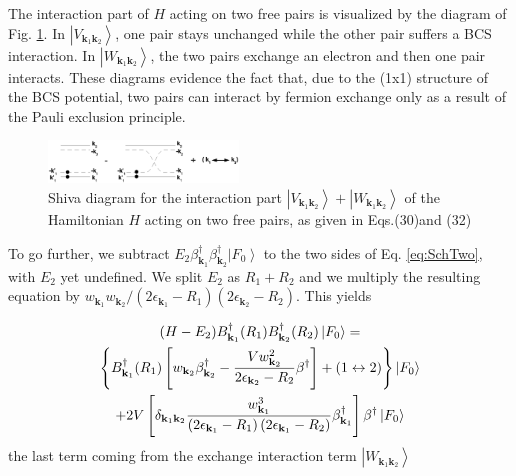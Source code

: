 \documentclass[aps,prb,superscriptaddress,showpacs,reprint,lengthcheck]{revtex4}
\begin{document}
The interaction part of $H$ acting on two free pairs is  visualized by
the diagram of Fig. \ref{fig:twoP}. In $\left|V_{\mathbf{k} _1\mathbf{k} _2}\right>$, one pair stays unchanged while the other pair suffers a BCS interaction. In $\left|W_{\mathbf{k} _1\mathbf{k} _2}\right>$, the two pairs exchange an electron and then one pair interacts.   These diagrams evidence the fact that,
due to the (1x1) structure of the BCS potential,  two pairs 
can  interact by fermion exchange only as a result of the
Pauli exclusion principle.

\begin{figure}[htb]
   \includegraphics[width=0.45\textwidth]{twoPair.eps}
\caption{Shiva diagram for the interaction part $\left|V_{\mathbf{k} _1\mathbf{k} _2}\right>+\left|W_{\mathbf{k} _1\mathbf{k} _2}\right>$ of the Hamiltonian $H$ acting on two free pairs, as given in Eqs.(30)and (32)}
\label{fig:twoP}
\end{figure}


To go further, we subtract $E _2\beta^{\dagger}_{\mathbf{k}
_1}\beta^{\dagger}_{\mathbf{k} _2}\left|F_0\right>  $ to the two sides of Eq.%
\eqref{eq:SchTwo}, with $E _2$ yet undefined. We split $E _2$ as $R_1+R_2$ and we multiply
the resulting equation by $w_{\mathbf{k} _1}w_{\mathbf{k} _2}/\left(2%
\epsilon_{\mathbf{k} _1}-R_1\right) \left(2\epsilon_{\mathbf{k}
_2}-R_2\right) $. This yields


\begin{multline}  \label{eq:SchTwo2}
(H-E _2)B^{\dagger}_{\mathbf{k} _1}(R_1)B^{\dagger}_{\mathbf{k}
_2}(R_2)\left|F_0\right>   = \\
\left\{B^{\dagger}_{\mathbf{k} _1}(R_1)\left[w_{\mathbf{k}
_2}\beta^{\dagger}_{\mathbf{k} _2}-\frac{Vw_{\mathbf{k} _2}^2}{2\epsilon_{%
\mathbf{k} _2}-R_2}\beta^{\dagger}\right]+(1\leftrightarrow2)\right\}
\left|F_0\right>  \\
+2V\left[\delta_{{\mathbf{k} _1}{\mathbf{k} _2}}\frac{w^3_{{\mathbf{k} _1}}}{\left(2%
\epsilon_{\mathbf{k} _1}-R_1\right) \left(2\epsilon_{\mathbf{k}
_1}-R_2\right)}\beta^\dagger_{{\mathbf{k} _1}}\right]\beta^\dagger\left|F_0\right>  
\end{multline}
the last term coming from the exchange interaction term $\left|W_{\mathbf{k} _1\mathbf{k} _2}\right>$
\end{document}
